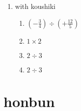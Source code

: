 \documentclass[twocolumn, fleqn]{jsarticle}
\begin{document}



\begin{enumerate}
  \item with koushiki
    \begin{enumerate}
      \item  $ (-\frac{3}{4} )\div (+\frac{12}{5}) $
        \vfill
      \item  $ 1 \times 2 $
        \vfill
      \item $ 2 \div 3 $
        \vfill
      \item $ 2 \div 3 $
    \end{enumerate}
\end{enumerate}

\newpage

\section{honbun}
\end{document}
